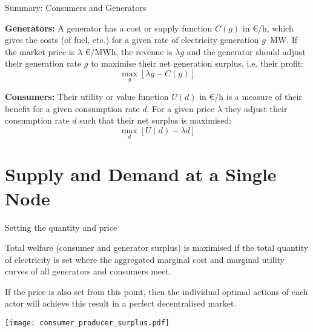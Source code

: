 \documentclass[10pt,dvipsnames]{beamer}
\def\l{\lambda}
\begin{document}
\begin{frame}{Summary: Consumers and Generators}

{\bf Generators:}  A generator has a \alert{cost} or \alert{supply function} $C(g)$ in \euro/h, which
  gives the costs (of fuel, etc.) for a given rate of electricity
  generation $g$~MW. If the market price is $\lambda$ \euro/MWh, the revenue is $\l g$ and the generator should adjust their
generation rate $g$ to maximise their \alert{net generation surplus}, i.e. their profit:
  \begin{equation*}
    \max_g \left[ \l g - C(g) \right]
  \end{equation*}


{\bf Consumers:} Their \alert{utility} or \alert{value function} $U(d)$ in \euro/h is a
  measure of their benefit for a given consumption rate $d$. For a given price $\lambda$ they adjust their consumption rate $d$ such that their \alert{net surplus} is maximised:
    \begin{equation*}
    \max_d \left[U(d) - \l d \right]
  \end{equation*}

  \end{frame}

\section{Supply and Demand at a Single Node}


\begin{frame}{Setting the quantity and price}

  \alert{Total welfare} (consumer and generator surplus) is maximised
  if the total quantity of electricity is set where the aggregated marginal cost and
  marginal utility curves of all generators and consumers meet.

  If the price is also set from this point, then the individual
  optimal actions of each actor will achieve this result in a perfect
  decentralised market.

  \centering
  \texttt{[image: consumer\_producer\_surplus.pdf]}




\end{frame}
\end{document}

